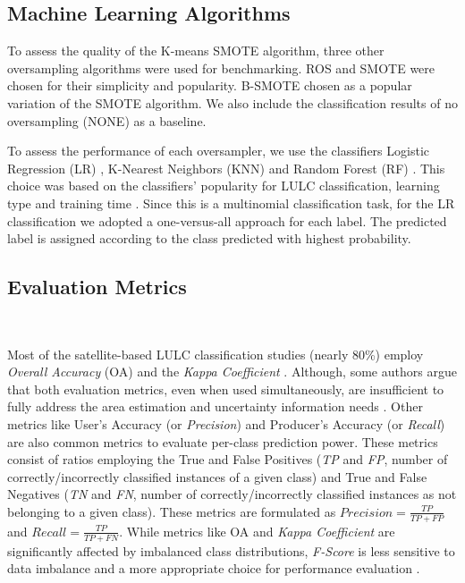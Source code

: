 \documentclass[information,article,submit,moreauthors,pdftex]{Definitions/mdpi}
\begin{document}
\begin{paracol}{2}
\linenumbers
\switchcolumn

\subsection{Machine Learning Algorithms}

To assess the quality of the K-means SMOTE algorithm,
three other oversampling algorithms were used for benchmarking. ROS and SMOTE
were chosen for their simplicity and popularity. B-SMOTE chosen as a popular
variation of the SMOTE algorithm. We also include the classification results
of no oversampling (NONE) as a baseline.

To assess the performance of each oversampler, we use the classifiers Logistic
Regression (LR) \citep{Nelder1972}, K-Nearest Neighbors (KNN)
\citep{Cover1967} and Random Forest (RF)
\citep{Liaw2002}. This choice was based on the classifiers' popularity for LULC
classification, learning type and training time
\citep{Maxwell2018,Gavade2019}. Since this is a multinomial classification
task, for the LR classification we adopted a one-versus-all approach for each
label. The predicted label is assigned according to the class predicted with
highest probability.

\subsection{Evaluation Metrics}~\label{sec:evaluation-metrics}

Most of the satellite-based LULC classification studies (nearly 80\%) employ
\textit{Overall Accuracy} (OA) and the \textit{Kappa Coefficient}
\citep{Gavade2019}. Although, some authors argue that both evaluation metrics,
even when used simultaneously, are insufficient to fully address the area
estimation and uncertainty information needs \citep{Olofsson2013,Pontius2011}.
Other metrics like User's Accuracy (or \textit{Precision}) and Producer's
Accuracy (or \textit{Recall}) are also common metrics to evaluate per-class
prediction power. These metrics consist of ratios employing the True and False
Positives (\textit{TP} and \textit{FP}, number of correctly/incorrectly
classified instances of a given class) and True and
False Negatives (\textit{TN} and \textit{FN}, number of correctly/incorrectly
classified instances as not belonging to a given
class). These metrics are formulated as $Precision = \frac{TP}{TP+FP}$ and
$Recall = \frac{TP}{TP+FN}$. While metrics like OA and \textit{Kappa
Coefficient} are significantly affected by imbalanced class distributions,
\textit{F-Score} is less sensitive to data imbalance and a more appropriate
choice for performance evaluation \citep{Jeni2013}.


\end{paracol}
\end{document}
